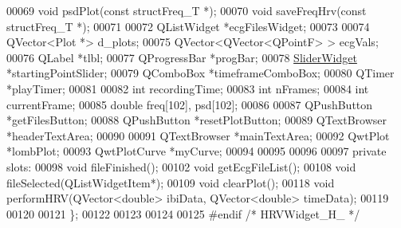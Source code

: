\begin{DoxyCode}
00069     \textcolor{keywordtype}{void} psdPlot(\textcolor{keyword}{const} structFreq\_T *); 
00070     \textcolor{keywordtype}{void} saveFreqHrv(\textcolor{keyword}{const} structFreq\_T *); 
00071 
00072     QListWidget *ecgFilesWidget;
00073 
00074     QVector<Plot *> d\_plots;
00075     QVector<QVector<QPointF> > ecgVals;
00076     QLabel *tlbl;
00077     QProgressBar *progBar;
00078     \hyperlink{classSliderWidget}{SliderWidget} *startingPointSlider;
00079     QComboBox *timeframeComboBox;
00080     QTimer *playTimer;
00081 
00082     \textcolor{keywordtype}{int} recordingTime;
00083     \textcolor{keywordtype}{int} nFrames;
00084     \textcolor{keywordtype}{int} currentFrame;
00085     \textcolor{keywordtype}{double} freq[102], psd[102];
00086 
00087     QPushButton *getFilesButton;
00088     QPushButton *resetPlotButton;
00089     QTextBrowser *headerTextArea;
00090 
00091      QTextBrowser *mainTextArea;
00092     QwtPlot *lombPlot;
00093     QwtPlotCurve *myCurve;
00094 
00095 
00096 
00097 \textcolor{keyword}{private} slots:
00098     \textcolor{keywordtype}{void} fileFinished();
00102     \textcolor{keywordtype}{void} getEcgFileList();
00108     \textcolor{keywordtype}{void} fileSelected(QListWidgetItem*);
00109     \textcolor{keywordtype}{void} clearPlot();
00118     \textcolor{keywordtype}{void} performHRV(QVector<double> ibiData, QVector<double> timeData);
00119 
00120 
00121 \};
00122 
00123 
00124 
00125 \textcolor{preprocessor}{#endif }\textcolor{comment}{/* HRVWidget\_H\_ */}\textcolor{preprocessor}{}
\end{DoxyCode}
